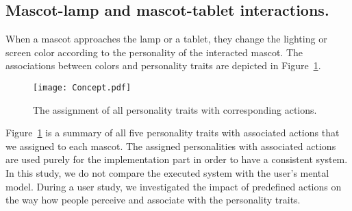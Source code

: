 \subsection*{Mascot-lamp and mascot-tablet interactions.}
When a mascot approaches the lamp or a tablet, they change the lighting or screen color according to the
personality of the interacted mascot.
The associations between colors and personality traits are depicted in Figure~\ref{fig:Concept}.

\begin{figure}[hbt!]
    \centering
    \texttt{[image: Concept.pdf]}
    \caption{The assignment of all personality traits with corresponding actions.}
    \label{fig:Concept}
\end{figure}

Figure~\ref{fig:Concept} is a summary of
all five personality traits with associated actions that we assigned to each mascot.
The assigned personalities with associated actions are used purely for the implementation part in order
to have a consistent system.
In this study, we do not compare the executed system with the user's mental model.
During a user study, we investigated the impact of predefined actions on the way how people
perceive and associate with the personality traits.